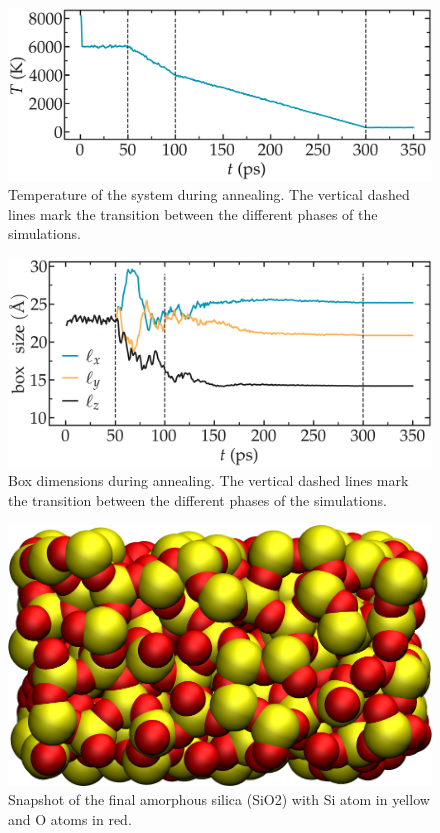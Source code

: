 \documentclass[9pt,tutorial]{livecoms}
\begin{document}
\begin{figure}
\centering
\includegraphics[width=\linewidth]{GCMC-temperature}
\caption{Temperature of the system during annealing. The vertical dashed lines mark the transition between the different phases of the simulations.}
\label{fig:GCMC-temperature}
\end{figure}

\begin{figure}
\centering
\includegraphics[width=\linewidth]{GCMC-dimension}
\caption{Box dimensions during annealing. The vertical dashed lines mark the transition between the different phases of the simulations.}
\label{fig:GCMC-dimension}
\end{figure}

\begin{figure}
\centering
\includegraphics[width=0.9\linewidth]{GCMC-snapshot}
\caption{Snapshot of the final amorphous silica (SiO2) with Si atom in yellow and O atoms in red.}
\label{fig:GCMC-snapshot}
\end{figure}
\end{document}
